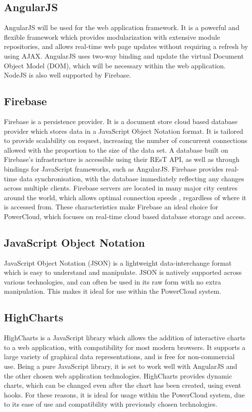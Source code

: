 \documentclass{article}
\begin{document}
	\subsection{AngularJS}
	
	AngularJS will be used for the web application framework. It is a 
	powerful and flexible framework which provides modularization with 
	extensive module repositories, and allows real-time web page updates 
	without requiring a refresh by using AJAX. AngularJS uses two-way 
	binding and update the virtual Document Object Model (DOM), which 
	will be necessary within the web application. NodeJS is also well 
	supported by Firebase.
	
	\subsection{Firebase}
	
	Firebase is a persistence provider. It is a document store cloud 
	based database provider which stores data in a JavaScript Object 
	Notation format. It is tailored to provide scalability on request, 
	increasing the number of concurrent connections allowed with the 
	proportion to the size of the data set. A database built on 
	Firebase's infrastructure is accessible using their REsT API, as well 
	as through bindings for JavaScript frameworks, such as AngularJS. 
	Firebase provides real-time data synchronisation, with the database 
	immediately reflecting any changes across multiple clients. Firebase 
	servers are located in many major city centres around the world, 
	which allows optimal connection speeds , regardless of where it is 
	accessed from. These characteristics make Firebase an ideal choice 
	for PowerCloud, which focuses on real-time cloud based database 
	storage and access.
	
	\subsection{JavaScript Object Notation}
	
	JavaScript Object Notation (JSON) is a lightweight data-interchange 
	format which is easy to understand and manipulate. JSON is natively 
	supported across various technologies, and can often be used in its 
	raw form with no extra manipulation. This makes it ideal for use 
	within the PowerCloud system.
	
	\subsection{HighCharts}
	
	HighCharts is a JavaScript library which allows the addition of 
	interactive charts to a web application, with compatibility for most 
	modern browsers. It supports a large variety of graphical data 
	representations, and is free for non-commercial use. Being a pure 
	JavaScript library, it is set to work well with AngularJS and the 
	other chosen web application technologies. HighCharts provides 
	dynamic charts, which can be changed even after the chart has been 
	created, using event hooks. For these reasons, it is ideal for usage 
	within the PowerCloud system, due to its ease of use and 
	compatibility with previously chosen technologies. 
\end{document}
